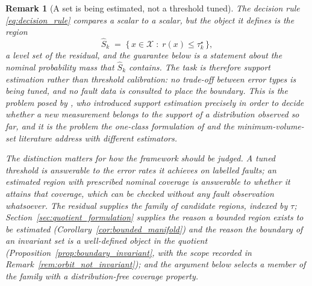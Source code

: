 \documentclass[a4paper]{cas-sc}
\newtheorem{remark}{Remark}
\newcommand{\X}{\ensuremath{\mathcal{X}}}
\newcommand{\residual}{\ensuremath{r}}
\begin{document}
\begin{remark}[A set is being estimated, not a threshold tuned]
\label{rem:support_estimation}
The decision rule \eqref{eq:decision_rule} compares a scalar to a scalar, but
the object it defines is the region
\begin{equation}
\widehat{S}_k \;=\; \bigl\{\, x\in\X \;:\; \residual(x)\le\tau_k^\star \,\bigr\},
\label{eq:acceptance_region}
\end{equation}
a level set of the residual, and the guarantee below is a statement about the
nominal probability mass that \(\widehat{S}_k\) contains. The task is
therefore \emph{support estimation} rather than threshold calibration: no
trade-off between error types is being tuned, and no fault data is consulted
to place the boundary. This is the problem posed by
\citet{devroye1980}, who introduced support estimation precisely in order to
decide whether a new measurement belongs to the support of a distribution
observed so far, and it is the problem the one-class formulation of
\citet{scholkopf2001} and the minimum-volume-set literature
\citep{scott2006} address with different estimators.

The distinction matters for how the framework should be judged. A tuned
threshold is answerable to the error rates it achieves on labelled faults; an
estimated region with prescribed nominal coverage is answerable to whether it
attains that coverage, which can be checked without any fault observation
whatsoever. The residual supplies the family of candidate regions, indexed by
\(\tau\); Section~\ref{sec:quotient_formulation} supplies the reason a
bounded region exists to be estimated
(Corollary~\ref{cor:bounded_manifold}) and the reason the boundary of an
invariant set is a well-defined object in the quotient
(Proposition~\ref{prop:boundary_invariant}, with the scope recorded in
Remark~\ref{rem:orbit_not_invariant}); and the argument below selects a
member of the family with a distribution-free coverage property.
\end{remark}
\end{document}
